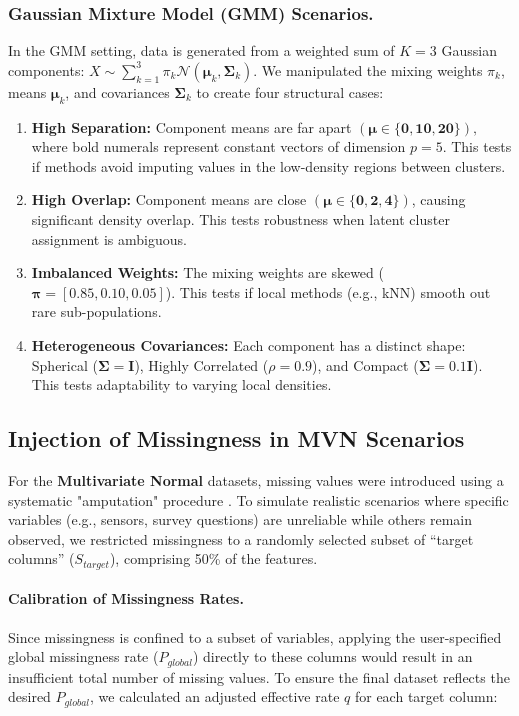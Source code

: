 \documentclass[11pt, a4paper]{article}
\begin{document}
\subsubsection*{Gaussian Mixture Model (GMM) Scenarios.}
In the GMM setting, data is generated from a weighted sum of $K=3$ Gaussian components: $X \sim \sum_{k=1}^{3} \pi_k \mathcal{N}(\boldsymbol{\mu}_k, \boldsymbol{\Sigma}_k)$.
We manipulated the mixing weights $\pi_k$, means $\boldsymbol{\mu}_k$, and covariances $\boldsymbol{\Sigma}_k$ to create four structural cases:

\begin{enumerate}
    \item \textbf{High Separation:} Component means are far apart $(\boldsymbol{\mu} \in \{\textbf{0}, \textbf{10}, \textbf{20}\}),$ where bold numerals represent constant vectors of dimension $p=5$.
    This tests if methods avoid imputing values in the low-density regions between clusters.
    \item \textbf{High Overlap:} Component means are close $(\boldsymbol{\mu} \in \{\textbf{0}, \textbf{2}, \textbf{4}\})$, causing significant density overlap.
    This tests robustness when latent cluster assignment is ambiguous.
    \item \textbf{Imbalanced Weights:} The mixing weights are skewed ($\boldsymbol{\pi} = [0.85, 0.10, 0.05]$).
    This tests if local methods (e.g., kNN) smooth out rare sub-populations.
    \item \textbf{Heterogeneous Covariances:} Each component has a distinct shape: Spherical ($\boldsymbol{\Sigma} = \mathbf{I}$), Highly Correlated ($\rho=0.9$), and Compact ($\boldsymbol{\Sigma} = 0.1 \mathbf{I}$).
This tests adaptability to varying local densities.
\end{enumerate}

\subsection{Injection of Missingness in MVN Scenarios}

For the \textbf{Multivariate Normal} datasets, missing values were introduced using a systematic "amputation" procedure \citep{Schouten2018}.
To simulate realistic scenarios where specific variables (e.g., sensors, survey questions) are unreliable while others remain observed, we restricted missingness to a randomly selected subset of ``target columns'' ($S_{target}$), comprising 50\% of the features.

\paragraph{Calibration of Missingness Rates.}
Since missingness is confined to a subset of variables, applying the user-specified global missingness rate ($P_{global}$) directly to these columns would result in an insufficient total number of missing values.
To ensure the final dataset reflects the desired $P_{global}$, we calculated an adjusted effective rate $q$ for each target column:
\end{document}
